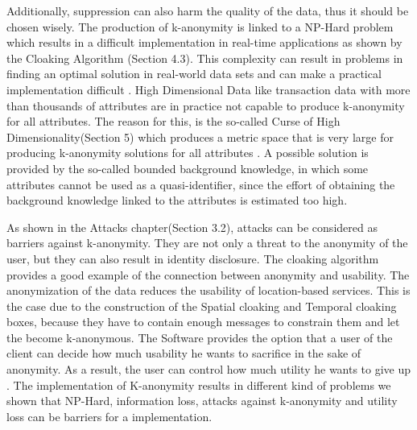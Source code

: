 \documentclass{llncs}
\begin{document}
Additionally, suppression can also harm the quality of the data, thus it should be chosen wisely. The production of k-anonymity is linked to a NP-Hard problem which results in a difficult implementation in real-time applications as shown by the Cloaking Algorithm (Section 4.3). This complexity can result in problems in finding an optimal solution in real-world data sets and can make a practical implementation difficult \cite{meyerson2004complexity}. High Dimensional Data like transaction data with more than thousands of attributes are in practice not capable to produce k-anonymity for all attributes. The reason for this, is the so-called Curse of High Dimensionality(Section 5) which produces a metric space that is very large for producing k-anonymity solutions for all attributes \cite{aggarwal2005k}. A possible solution is provided by the so-called bounded background knowledge, in which some attributes cannot be used as a quasi-identifier, since the effort of obtaining the background knowledge linked to the attributes is estimated too high.

As shown in the Attacks chapter(Section 3.2), attacks can be considered as barriers against k-anonymity. They are not only a threat to the anonymity of the user, but they can also result in identity disclosure. The cloaking algorithm provides a good example of the connection between anonymity and usability. The anonymization of the data reduces the usability of location-based services. This is the case due to the construction of the Spatial cloaking and Temporal cloaking boxes, because they have to contain enough messages to constrain them and let the become k-anonymous. The Software provides the option that a user of the client can decide how much usability he wants to sacrifice in the sake of anonymity. As a result, the user can control how much utility he wants to give up \cite{gedik2004customizable}. The implementation of K-anonymity results in different kind of problems we shown that NP-Hard, information loss, attacks against k-anonymity and utility loss can be barriers for a implementation.

\newpage


\end{document}
